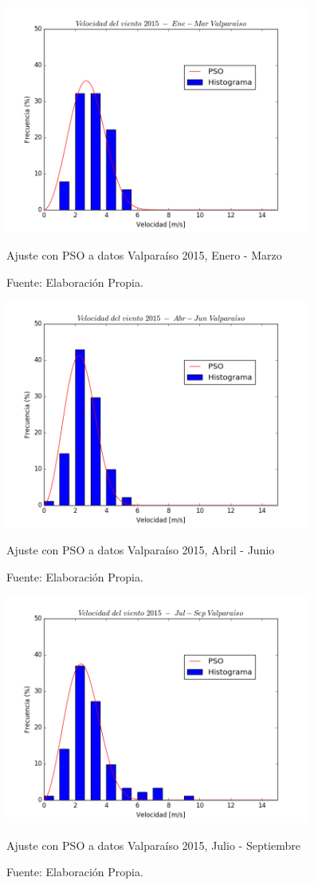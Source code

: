 \begin{figure}[H]
    \centering
    \includegraphics[height=75mm]{figures/result_2015_Ene-Mar.png}
    \caption{Ajuste con PSO a datos Valparaíso 2015, Enero - Marzo}
    \vspace{-.25cm}
    \caption*{Fuente: Elaboración Propia.}
    \label{fig:pso_valpo_15_ene_mar}
\end{figure}
\begin{figure}[H]
    \centering
    \includegraphics[height=75mm]{figures/result_2015_Abr-Jun.png}
    \caption{Ajuste con PSO a datos Valparaíso 2015, Abril - Junio}
    \vspace{-.25cm}
    \caption*{Fuente: Elaboración Propia.}
    \label{fig:pso_valpo_15_abr_jun}
\end{figure}
\begin{figure}[H]
    \centering
    \includegraphics[height=75mm]{figures/result_2015_Jul-Sep.png}
    \caption{Ajuste con PSO a datos Valparaíso 2015, Julio - Septiembre}
    \vspace{-.25cm}
    \caption*{Fuente: Elaboración Propia.}
    \label{fig:pso_valpo_15_jul_sep}
\end{figure}
